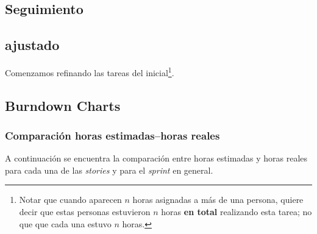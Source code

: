 
  \begin{landscape}
\section{Seguimiento}
  \subsection{\sprintback{} ajustado}
  Comenzamos refinando las tareas del \prodback{} inicial\footnote{Notar que cuando aparecen $n$ horas asignadas a m\'as de
               una persona, quiere decir que estas personas estuvieron $n$
               horas \textbf{en total} realizando esta tarea; no que que
               cada una estuvo $n$ horas.}.

    
  \end{landscape}

  \subsection{Burndown Charts}

  \subsubsection{Comparaci\'on horas estimadas--horas reales}
  A continuaci\'on se encuentra la comparaci\'on entre horas estimadas
  y horas reales para cada una de las \textit{stories} y para el
  \textit{sprint} en general.

  \vspace{1cm}

